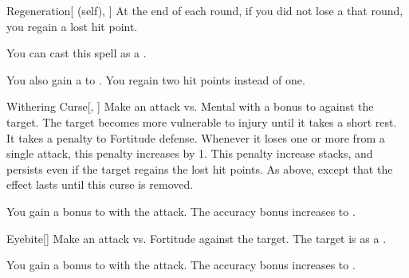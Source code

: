 \lowercase{\hypertarget{spell:Regeneration}{}}\label{spell:Regeneration}
\begin{attuneability}[Rank 4]{\hypertarget{spell:Regeneration}{Regeneration}}[ (self), ]
At the end of each round, if you did not lose a  that round, you regain a lost hit point.

You can cast this spell as a .

\rankline
{} You also gain a   to .
 You regain two hit points instead of one.
\end{attuneability}
\vspace{0.25em}



\lowercase{\hypertarget{spell:Withering Curse}{}}\label{spell:Withering Curse}
\begin{freeability}[Rank 4]{\hypertarget{spell:Withering Curse}{Withering Curse}}[, ]
Make an attack vs. Mental with a  bonus to  against the target.
\hit The target becomes more vulnerable to injury until it takes a short rest.
It takes a  penalty to Fortitude defense.
Whenever it loses one or more  from a single attack, this penalty increases by 1.
This penalty increase stacks, and persists even if the target regains the lost hit points.
\crit As above, except that the effect lasts until this curse is removed.

\rankline
{} You gain a  bonus to  with the attack.
 The accuracy bonus increases to .
\end{freeability}
\vspace{0.25em}



\lowercase{\hypertarget{spell:Eyebite}{}}\label{spell:Eyebite}
\begin{freeability}[Rank 5]{\hypertarget{spell:Eyebite}{Eyebite}}[]
Make an attack vs. Fortitude against the target.
\hit The target is  as a .

\rankline
{} You gain a  bonus to  with the attack.
 The accuracy bonus increases to .
\end{freeability}
\vspace{0.25em}



